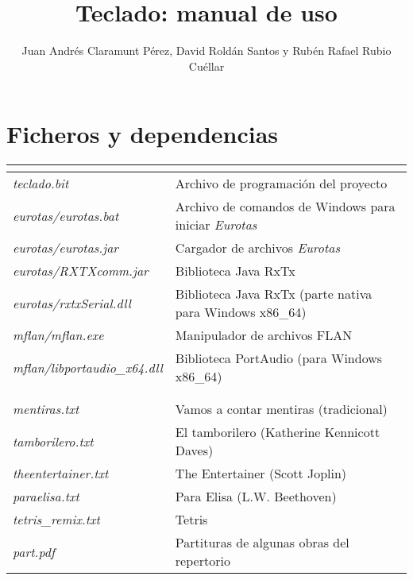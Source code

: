 \documentclass{article}
\title{Teclado: manual de uso}
\author{Juan Andrés Claramunt Pérez, David Roldán Santos y Rubén Rafael Rubio Cuéllar}
\begin{document}
\maketitle

\section{Ficheros y dependencias}

\let\sep\hline


\begin{tabu}{| >{\itshape}X[5, l] | X[14, l] |}
	 \\ \sep
	teclado.bit & Archivo de programación del proyecto \\ \sep
	eurotas/eurotas.bat & Archivo de comandos de Windows para iniciar {\itshape Eurotas} \\ \sep
	eurotas/eurotas.jar & Cargador de archivos {\itshape Eurotas} \\ \sep
	eurotas/RXTXcomm.jar & Biblioteca Java RxTx \\ \sep
	eurotas/rxtxSerial.dll & Biblioteca Java RxTx (parte nativa para Windows x86\_64) \\ \sep
	mflan/mflan.exe & Manipulador de archivos FLAN \\ \sep
	mflan/libportaudio\_x64.dll & Biblioteca PortAudio (para Windows x86\_64) \\ \sep

	 \\
	 \\ \sep
	mentiras.txt & Vamos a contar mentiras (tradicional) \\ \sep
	tamborilero.txt & El tamborilero (Katherine Kennicott Daves) \\ \sep
	theentertainer.txt & The Entertainer (Scott Joplin) \\ \sep
	paraelisa.txt & Para Elisa (L.W. Beethoven) \\ \sep
	tetris\_remix.txt & Tetris \\ \sep
	part.pdf & Partituras de algunas obras del repertorio \\ \sep


\end{tabu}
\end{document}

